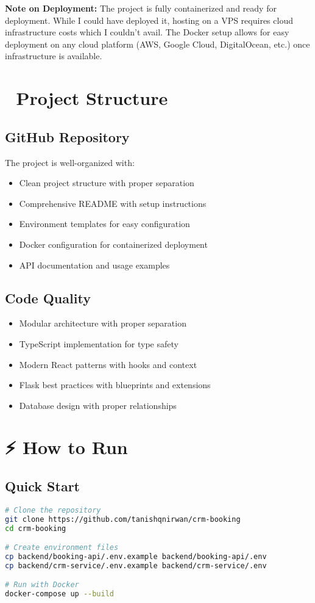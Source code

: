 \documentclass[12pt,a4paper]{article}
\begin{document}
\textbf{Note on Deployment:} The project is fully containerized and ready for deployment. While I could have deployed it, hosting on a VPS requires cloud infrastructure costs which I couldn't avail. The Docker setup allows for easy deployment on any cloud platform (AWS, Google Cloud, DigitalOcean, etc.) once infrastructure is available.

\section{📁 Project Structure}

\subsection{GitHub Repository}
The project is well-organized with:
\begin{itemize}
    \item Clean project structure with proper separation
    \item Comprehensive README with setup instructions
    \item Environment templates for easy configuration
    \item Docker configuration for containerized deployment
    \item API documentation and usage examples
\end{itemize}

\subsection{Code Quality}
\begin{itemize}
    \item Modular architecture with proper separation
    \item TypeScript implementation for type safety
    \item Modern React patterns with hooks and context
    \item Flask best practices with blueprints and extensions
    \item Database design with proper relationships
\end{itemize}

\section{⚡ How to Run}

\subsection{Quick Start}
\begin{lstlisting}[language=bash]
# Clone the repository
git clone https://github.com/tanishqnirwan/crm-booking
cd crm-booking

# Create environment files
cp backend/booking-api/.env.example backend/booking-api/.env
cp backend/crm-service/.env.example backend/crm-service/.env

# Run with Docker
docker-compose up --build
\end{lstlisting}
\end{document}
